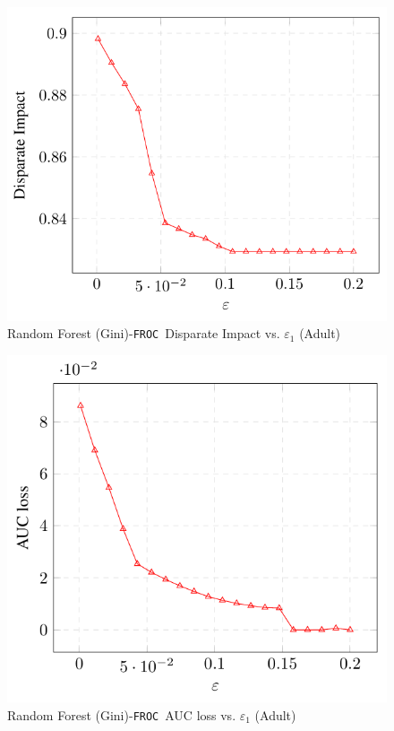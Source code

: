 \documentclass{article}
\newcommand{\ouralgo}{\texttt{FROC}}
\begin{document}
\begin{figure}[!h]
    \centering
    \includegraphics[width=1\linewidth]{Images/RFG_Adult_DI.png}
    \caption{Random Forest (Gini)-\ouralgo\  Disparate Impact vs. $\varepsilon_1$ (Adult)}
    \label{fig:RFG_Adult_DI}
\end{figure}

\begin{figure}[!h]
    \centering
    \includegraphics[width=1\linewidth]{Images/RFG_Adult_AUC.png}
    \caption{Random Forest (Gini)-\ouralgo\ AUC loss vs. $\varepsilon_1$ (Adult)}
    \label{fig:RFG_Adult_AUC}
\end{figure}
\end{document}
